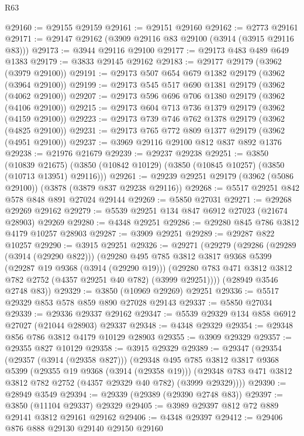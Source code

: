 \begin{lexlean}{R63}
\begin{coremodule}
@29160 := @29155 @29159
@29161 := @29151 @29160
@29162 := @2773 @29161
@29171 := @29147 @29162 (@3909 @29116 @83 @29100 (@3914 (@3915 @29116 @83)))
@29173 := @3944 @29116 @29100
@29177 := @29173 @483 @489 @649 @1383
@29179 := @3833 @29145 @29162
@29183 := @29177 @29179 (@3962 (@3979 @29100))
@29191 := @29173 @507 @654 @679 @1382 @29179 (@3962 (@3964 @29100))
@29199 := @29173 @545 @517 @690 @1381 @29179 (@3962 (@4062 @29100))
@29207 := @29173 @596 @696 @706 @1380 @29179 (@3962 (@4106 @29100))
@29215 := @29173 @604 @713 @736 @1379 @29179 (@3962 (@4159 @29100))
@29223 := @29173 @739 @746 @762 @1378 @29179 (@3962 (@4825 @29100))
@29231 := @29173 @765 @772 @809 @1377 @29179 (@3962 (@4951 @29100))
@29237 := @3969 @29116 @29100 @812 @837 @892 @1376
@29238 := @21976 @21679
@29239 := @29237 @29238
@29251 := @3850
    (@10839 @21675)
    (@3850 (@10842 @10129) (@3850 (@10845 @10257) (@3850 (@10713 @13951) @29116)))
@29261 := @29239 @29251 @29179 (@3962 (@5086 @29100)) (@3878 (@3879 @837 @29238 @29116))
@29268 := @5517 @29251 @842 @578 @848 @891 @27024 @29144
@29269 := @5850 @27031
@29271 := @29268 @29269 @29162
@29279 := @5539 @29251 @134 @847 @6912 @27023 (@21674 @28903) @29269
@29280 := @4348 @29251
@29286 := @29280 @845 @786 @3812 @4179 @10257 @28903
@29287 := @3909 @29251
@29289 := @29287 @822 @10257
@29290 := @3915 @29251
@29326 := @29271
    (@29279
      (@29286
        (@29289 (@3914 (@29290 @822)))
        (@29280
          @495
          @785
          @3812
          @3817
          @9368
          @5399
          (@29287 @19 @9368 (@3914 (@29290 @19)))
          (@29280 @783 @471 @3812 @3812 @782 @2752 (@4357 @29251 @40 @782) (@3999 @29251))))
      (@28949 @3546 @2748 @83))
@29329 := @3850 (@10969 @29269) @29251
@29336 := @5517 @29329 @853 @578 @859 @890 @27028 @29143
@29337 := @5850 @27034
@29339 := @29336 @29337 @29162
@29347 := @5539 @29329 @134 @858 @6912 @27027 (@21044 @28903) @29337
@29348 := @4348 @29329
@29354 := @29348 @856 @786 @3812 @4179 @10129 @28903
@29355 := @3909 @29329
@29357 := @29355 @827 @10129
@29358 := @3915 @29329
@29389 := @29347
    (@29354
      (@29357 (@3914 (@29358 @827)))
      (@29348
        @495
        @785
        @3812
        @3817
        @9368
        @5399
        (@29355 @19 @9368 (@3914 (@29358 @19)))
        (@29348 @783 @471 @3812 @3812 @782 @2752 (@4357 @29329 @40 @782) (@3999 @29329))))
@29390 := @28949 @3549
@29394 := @29339 (@29389 (@29390 @2748 @83))
@29397 := @3850 (@11104 @29337) @29329
@29405 := @3989 @29397 @812 @72 @889 @29141 @3812 @29161 @29162
@29406 := @4348 @29397
@29412 := @29406 @876 @888 @29130 @29140 @29150 @29160

\end{coremodule}
\end{lexlean}
